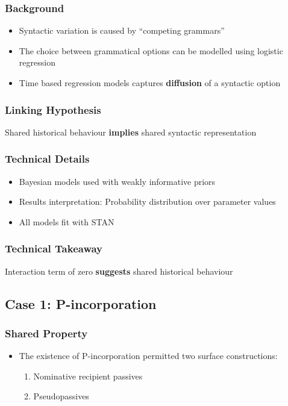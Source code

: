 \documentclass{beamer}
\begin{document}
\begin{frame}
	\frametitle{Background}
	\begin{itemize}
		\item Syntactic variation is caused by ``competing grammars'' \citep{Kroch.1989}
		\item The choice between grammatical options can be modelled using logistic regression
		\item Time based regression models captures \textbf{diffusion} of a syntactic option
	\end{itemize}
\end{frame}

\begin{frame}
	\frametitle{Linking Hypothesis}
	\vfill
	\Large
	Shared historical behaviour \textbf{implies} shared syntactic representation
	\vfill
\end{frame}

\begin{frame}
	\frametitle{Technical Details}
	\begin{itemize}
		\item Bayesian models used with weakly informative priors
		\item Results interpretation: Probability distribution over parameter values
		\item All models fit with STAN
	\end{itemize}
\end{frame}

\begin{frame}
	\frametitle{Technical Takeaway}
	\vfill
	Interaction term of zero \textbf{suggests} shared historical behaviour
	\vfill
\end{frame}
\subsection{Case 1: P-incorporation}

\begin{frame}
	\frametitle{Shared Property}
	\begin{itemize}
		\item The existence of P-incorporation permitted two surface constructions:
			\begin{enumerate}
				\item Nominative recipient passives
				\item Pseudopassives
			\end{enumerate}
	\end{itemize}
\end{frame}
\end{document}
